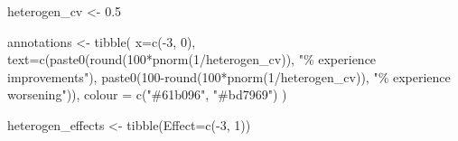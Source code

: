 \documentclass[
]{article}
\newenvironment{Shaded}{\begin{snugshade}}{\end{snugshade}}
\newcommand{\AttributeTok}[1]{\textcolor[rgb]{0.77,0.63,0.00}{#1}}
\newcommand{\DecValTok}[1]{\textcolor[rgb]{0.00,0.00,0.81}{#1}}
\newcommand{\FloatTok}[1]{\textcolor[rgb]{0.00,0.00,0.81}{#1}}
\newcommand{\FunctionTok}[1]{\textcolor[rgb]{0.00,0.00,0.00}{#1}}
\newcommand{\NormalTok}[1]{#1}
\newcommand{\OtherTok}[1]{\textcolor[rgb]{0.56,0.35,0.01}{#1}}
\newcommand{\SpecialCharTok}[1]{\textcolor[rgb]{0.00,0.00,0.00}{#1}}
\newcommand{\StringTok}[1]{\textcolor[rgb]{0.31,0.60,0.02}{#1}}
\begin{document}
\begin{Shaded}
\begin{Highlighting}[]
\NormalTok{heterogen\_cv }\OtherTok{\textless{}{-}} \FloatTok{0.5}

\NormalTok{annotations }\OtherTok{\textless{}{-}} \FunctionTok{tibble}\NormalTok{(}
  \AttributeTok{x=}\FunctionTok{c}\NormalTok{(}\SpecialCharTok{{-}}\DecValTok{3}\NormalTok{, }\DecValTok{0}\NormalTok{),}
  \AttributeTok{text=}\FunctionTok{c}\NormalTok{(}\FunctionTok{paste0}\NormalTok{(}\FunctionTok{round}\NormalTok{(}\DecValTok{100}\SpecialCharTok{*}\FunctionTok{pnorm}\NormalTok{(}\DecValTok{1}\SpecialCharTok{/}\NormalTok{heterogen\_cv)), }\StringTok{"\% experience improvements"}\NormalTok{),}
         \FunctionTok{paste0}\NormalTok{(}\DecValTok{100}\SpecialCharTok{{-}}\FunctionTok{round}\NormalTok{(}\DecValTok{100}\SpecialCharTok{*}\FunctionTok{pnorm}\NormalTok{(}\DecValTok{1}\SpecialCharTok{/}\NormalTok{heterogen\_cv)), }\StringTok{"\% experience worsening"}\NormalTok{)),}
  \AttributeTok{colour =} \FunctionTok{c}\NormalTok{(}\StringTok{"\#61b096"}\NormalTok{, }\StringTok{"\#bd7969"}\NormalTok{)}
\NormalTok{)}

\NormalTok{heterogen\_effects }\OtherTok{\textless{}{-}} \FunctionTok{tibble}\NormalTok{(}\AttributeTok{Effect=}\FunctionTok{c}\NormalTok{(}\SpecialCharTok{{-}}\DecValTok{3}\NormalTok{, }\DecValTok{1}\NormalTok{)) }


\end{Highlighting}
\end{Shaded}
\end{document}
